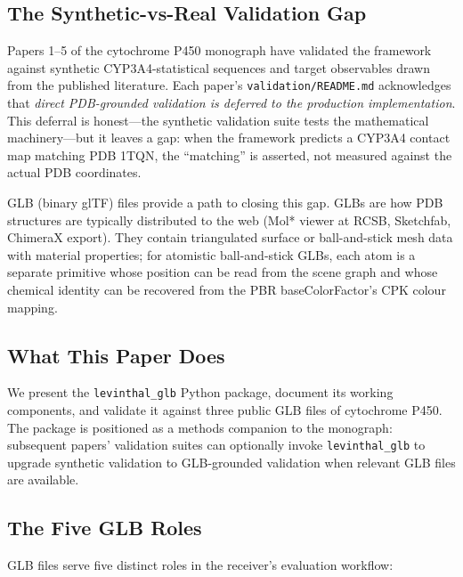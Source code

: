 \documentclass[11pt,twocolumn,a4paper]{article}
\theoremstyle{definition}
\theoremstyle{remark}
\begin{document}
\subsection{The Synthetic-vs-Real Validation Gap}

Papers 1--5 of the cytochrome P450 monograph have validated the framework
against synthetic CYP3A4-statistical sequences and target observables
drawn from the published literature. Each paper's
\texttt{validation/README.md} acknowledges that \emph{direct
PDB-grounded validation is deferred to the production implementation}.
This deferral is honest---the synthetic validation suite tests the
mathematical machinery---but it leaves a gap: when the framework
predicts a CYP3A4 contact map matching PDB 1TQN, the ``matching''
is asserted, not measured against the actual PDB coordinates.

GLB (binary glTF) files provide a path to closing this gap. GLBs are how
PDB structures are typically distributed to the web (Mol* viewer at
RCSB, Sketchfab, ChimeraX export). They contain triangulated surface or
ball-and-stick mesh data with material properties; for atomistic
ball-and-stick GLBs, each atom is a separate primitive whose position
can be read from the scene graph and whose chemical identity can be
recovered from the PBR baseColorFactor's CPK colour mapping.

\subsection{What This Paper Does}

We present the \texttt{levinthal\_glb} Python package, document its
working components, and validate it against three public GLB files of
cytochrome P450. The package is positioned as a methods companion to the
monograph: subsequent papers' validation suites can optionally invoke
\texttt{levinthal\_glb} to upgrade synthetic validation to GLB-grounded
validation when relevant GLB files are available.

\subsection{The Five GLB Roles}

GLB files serve five distinct roles in the receiver's evaluation
workflow:
\end{document}
